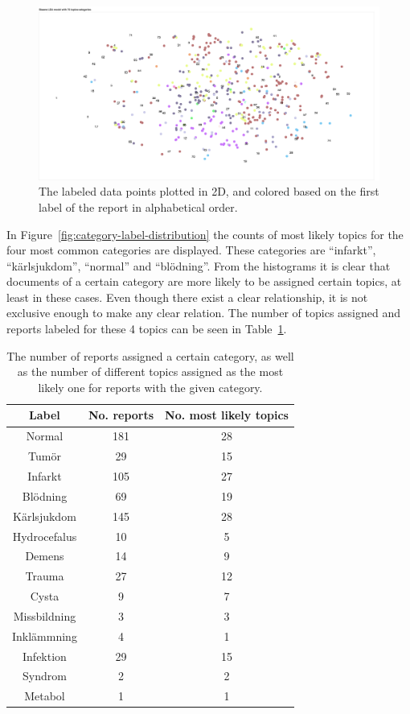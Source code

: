 \begin{figure}[ht!]
    \centering
    \includegraphics[width=\textwidth]{figures/categories-lda-75.png}
    \caption{The labeled data points plotted in 2D, and colored based on the first label of the report in alphabetical order.}
    \label{fig:categories-lda-75}
\end{figure}

In Figure~\ref{fig:category-label-distribution} the counts of most likely topics for the four most common categories are displayed.
These categories are ``infarkt'', ``kärlsjukdom'', ``normal'' and ``blödning''.
From the histograms it is clear that documents of a certain category are more likely to be assigned certain topics, at least in these cases.
Even though there exist a clear relationship, it is not exclusive enough to make any clear relation.
The number of topics assigned and reports labeled for these 4 topics can be seen in Table~\ref{tab:topic-categories}.

\begin{table}[ht!]
    \centering
    \begin{tabular}{|c|cc|}
        \hline
        \textbf{Label} & \textbf{No. reports} & \textbf{No. most likely topics} \\
        \hline
        Normal & 181 & 28\\
        Tumör & 29 & 15\\
        Infarkt & 105 & 27\\
        Blödning & 69 & 19\\
        Kärlsjukdom & 145 & 28\\
        Hydrocefalus & 10 & 5\\
        Demens & 14 & 9\\
        Trauma & 27 & 12\\
        Cysta & 9 & 7\\
        Missbildning & 3 & 3\\
        Inklämmning & 4 & 1\\
        Infektion & 29 & 15\\
        Syndrom & 2 & 2\\
        Metabol & 1 & 1\\
        \hline
    \end{tabular}
    \caption{The number of reports assigned a certain category, as well as the number of different topics assigned as the most likely one for reports with the given category.}
    \label{tab:topic-categories}
\end{table}


